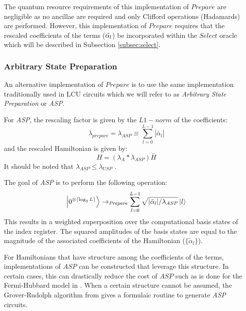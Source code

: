 The quantum resource requirements of this implementation of $\textit{Prepare}$ are negligible as no ancillae are required and only Clifford operations (Hadamards) are performed.
However, this implementation of $\textit{Prepare}$ requires that the rescaled coefficients of the terms ($\Tilde{\alpha_l}$) be incorporated within the $\textit{Select}$ oracle which will be described in Subsection \ref{subsec:select}.

\subsubsection{Arbitrary State Preparation}
\label{subsubsec:asp}

An alternative implementation of $\textit{Prepare}$ is to use the same implementation traditionally used in LCU circuits which we will refer to as \textit{Arbitrary State Preparation} or \textit{ASP}.

For \textit{ASP}, the rescaling factor is given by the $L1-norm$ of the coefficients:
\begin{equation}
    \label{eq:asp-scale}
    \lambda_{prepare} = \lambda_{ASP} \equiv \sum_{l=0}^{L-1} | \tilde{\alpha_l} |
\end{equation}
and the rescaled Hamiltonian is given by:
\begin{equation}
    H = (\lambda_A * \lambda_{ASP}) \bar{H}
\end{equation}
It should be noted that $\lambda_{ASP} \leq \lambda_{USP}$  .

The goal of \textit{ASP} is to perform the following operation:
\begin{equation}
    \ket{0^{\otimes \lceil \log_2{L} \rceil}} \rightarrow_{\textit{Prepare}} \sum_{l = 0}^{L-1} \sqrt{|\tilde{\alpha}_l| / \lambda_{ASP}} \ket{l}
\end{equation}
This results in a weighted superposition over the computational basis states of the index register.
The squared amplitudes of the basis states are equal to the magnitude of the associated coefficients of the Hamiltonian ($\{\tilde{\alpha}_l\}$).

For Hamiltonians that have structure among the coefficients of the terms, implementations of $\textit{ASP}$ can be constructed that leverage this structure.
In certain cases, this can drastically reduce the cost of $\textit{ASP}$ such as is done for the Fermi-Hubbard model in \cite{babbush2018encoding}.
When a certain structure cannot be assumed, the Grover-Rudolph algorithm from \cite{grover2002creating} gives a formulaic routine to generate \textit{ASP} circuits.

